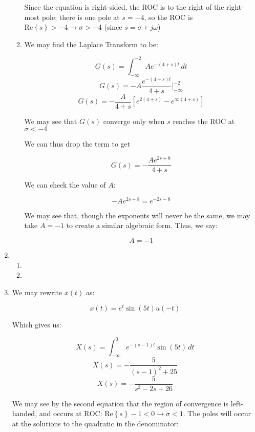 \begin{enumerate}
\begin{enumerate}
        Since the equation is right-sided, the ROC is to the right of the right-most pole; there is one pole at $s=-4$, so the ROC is $\text{Re}\left\{ s \right\}>-4\longrightarrow \sigma >-4$ (since $s=\sigma+j\omega$)

      \item 

        We may find the Laplace Transform to be:

        $$G(s)=\int_{-\infty}^{-2} Ae^{-(4+s)t}\,dt$$
        $$G(s)=-A\frac{e^{-(4+s)t}}{4+s}\Big|_{-\infty}^{-2}$$
        $$G(s)=-\frac{A}{4+s}\left[e^{2(4+s)}-e^{\infty(4+s)}\right]$$

        We may see that $G(s)$ converge only when $s$ reaches the ROC at $\sigma<-4$

        We can thus drop the term to get

        $$G(s)=-\frac{Ae^{2s+8}}{4+s}$$

        We can check the value of $A$:

        $$-Ae^{2s+8}=e^{-2s-8}$$

        We may see that, though the exponents will never be the same, we may take $A=-1$ to create a similar algebraic form. Thus, we say:

        $$\boxed{A=-1}$$

    \end{enumerate}

  \item

    \begin{enumerate}

      \item 

      \item 

    \end{enumerate}

  \item

    We may rewrite $x(t)$ as:

    $$x(t)=e^t\sin(5t)u(-t)$$

    Which gives us:

    $$X(s)=\int_{-\infty}^{0}e^{-(s-1)t}\sin(5t)\,dt$$
    $$X(s)=-\frac{5}{(s-1)^2+25}$$
    $$\boxed{X(s)=-\frac{5}{s^2-2s+26}}$$

    We may see by the second equation that the region of convergence is left-handed, and occurs at $\boxed{\text{ROC: }\text{Re}\left\{s\right\}-1<0\longrightarrow \sigma <1}$. The poles will occur at the solutions to the quadratic in the denominator:


\end{enumerate}
